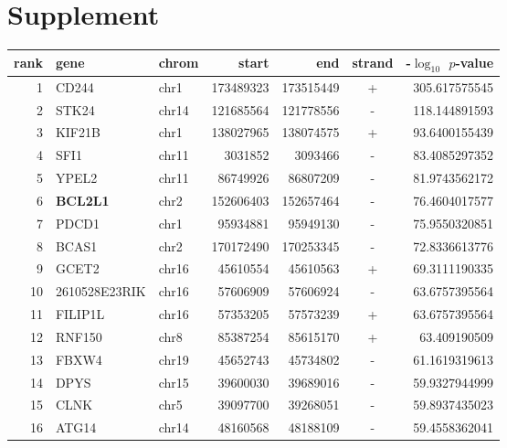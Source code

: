 


\section{Supplement}
\begin{table}
\small \centering 
 \begin{tabular}{rllrrcr}
rank & gene & chrom & start & end & strand & -$\log_{10}$ $p$-value \\\hline
1 & CD244 & chr1 & 173489323 & 173515449 & + & 305.617575545 \\
2 & STK24 & chr14 & 121685564 & 121778556 & - & 118.144891593 \\
3 & KIF21B & chr1 & 138027965 & 138074575 & + & 93.6400155439 \\
4 & SFI1 & chr11 & 3031852 & 3093466 & - & 83.4085297352 \\
5 & YPEL2 & chr11 & 86749926 & 86807209 & - & 81.9743562172 \\
6 & \textbf{BCL2L1} & chr2 & 152606403 & 152657464 & - & 76.4604017577 \\
7 & PDCD1 & chr1 & 95934881 & 95949130 & - & 75.9550320851 \\
8 & BCAS1 & chr2 & 170172490 & 170253345 & - & 72.8336613776 \\
9 & GCET2 & chr16 & 45610554 & 45610563 & + & 69.3111190335 \\
10 & 2610528E23RIK & chr16 & 57606909 & 57606924 & - & 63.6757395564 \\
11 & FILIP1L & chr16 & 57353205 & 57573239 & + & 63.6757395564 \\
12 & RNF150 & chr8 & 85387254 & 85615170 & + & 63.409190509 \\
13 & FBXW4 & chr19 & 45652743 & 45734802 & - & 61.1619319613 \\
14 & DPYS & chr15 & 39600030 & 39689016 & - & 59.9327944999 \\
15 & CLNK & chr5 & 39097700 & 39268051 & - & 59.8937435023 \\
16 & ATG14 & chr14 & 48160568 & 48188109 & - & 59.4558362041 \\

\end{tabular}
\end{table}
